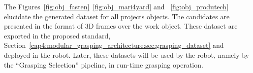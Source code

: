 The Figures~\ref{fig:obj_fasten}~\ref{fig:obj_mari4yard} and ~\ref{fig:obj_produtech} elucidate the generated dataset for all projects objects. The candidates are presented in the format of 3D frames over the work object. These dataset are exported in the proposed standard, Section~\ref{cap4:modular_grasping_architecture:sec:grasping_dataset} and deployed in the robot. Later, these datasets will be used by the robot, namely by the ``Grasping Selection'' pipeline, in run-time grasping operation.

 \begin{figure}[h!]
\end{figure}
